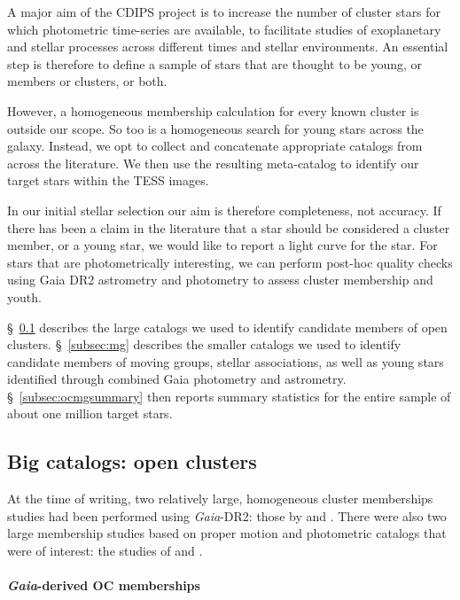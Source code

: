 \documentclass[12pt,twocolumn,tighten]{aastex62}
\begin{document}
A major aim of the CDIPS project is to increase the number of
cluster stars for which photometric time-series are
available, to facilitate studies of exoplanetary and stellar
processes across different times and stellar environments.
An essential step is therefore to define a sample of
stars that are thought to be young, or members or clusters, or both.

However, a homogeneous membership calculation for every known
cluster is outside our scope.  So too is a homogeneous search for
young stars across the galaxy.
Instead, we opt to collect
and concatenate appropriate catalogs from across the literature.  
We then use the resulting meta-catalog to identify our target stars within the 
TESS images.

In our initial stellar selection our aim is therefore completeness, not 
accuracy.  If there has
been a claim in the literature that a star should be considered a
cluster member, or a young star, we would like to report a light curve for the 
star.
For stars that are photometrically interesting, we can perform post-hoc
quality checks using Gaia DR2 astrometry and photometry to assess cluster 
membership and youth.

\S~\ref{subsec:oc} describes the large catalogs we used to 
identify candidate members of open clusters.
\S~\ref{subsec:mg} describes the smaller catalogs we used to identify 
candidate members of moving groups, stellar associations, as well as young 
stars identified through combined Gaia photometry and astrometry.
\S~\ref{subsec:ocmgsummary} then reports summary statistics for the entire 
sample of about one million target stars.


\subsection{Big catalogs: open clusters}
\label{subsec:oc}

At the time of writing, two relatively large, homogeneous cluster
memberships studies had been performed using {\it Gaia}-DR2: those by
\citet{cantat-gaudin_gaia_2018} and \citet{gaia_hr_2018}.
There were also two large membership studies based on proper motion and 
photometric catalogs that were of interest: the studies of
\citet{Kharchenko_et_al_2013} and \citet{dias_proper_2014}.

\paragraph{{\it Gaia}-derived OC memberships}
\end{document}
